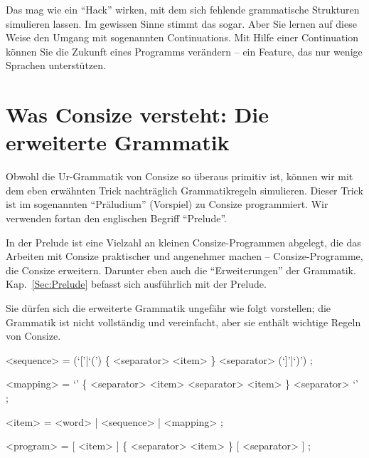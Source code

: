 

Das mag wie ein "`Hack"' wirken, mit dem sich fehlende grammatische Strukturen simulieren lassen. Im gewissen Sinne stimmt das sogar. Aber Sie lernen auf diese Weise den Umgang mit sogenannten Continuations. Mit Hilfe einer Continuation können Sie die Zukunft eines Programms verändern -- ein Feature, das nur wenige Sprachen unterstützen. 

\section{Was Consize versteht: Die erweiterte Grammatik}

Obwohl die Ur-Grammatik von Consize so überaus primitiv ist, können wir mit dem eben erwähnten Trick nachträglich Grammatikregeln simulieren. Dieser Trick ist im sogenannten "`Präludium"' (Vorspiel) zu Consize programmiert. Wir verwenden fortan den englischen Begriff "`Prelude"'.

In der Prelude ist eine Vielzahl an kleinen Consize-Programmen abgelegt, die das Arbeiten mit Consize praktischer und angenehmer machen -- Consize-Programme, die Consize erweitern. Darunter eben auch die "`Erweiterungen"' der Grammatik. Kap.~\ref{Sec:Prelude} befasst sich ausführlich mit der Prelude.

Sie dürfen sich die erweiterte Grammatik ungefähr wie folgt vorstellen; die Grammatik ist nicht vollständig und vereinfacht, aber sie enthält wichtige Regeln von Consize.

\begin{grammar}
<sequence> = (`['|`(') \{ <separator> <item> \} <separator> (`]'|`)') ;

<mapping> = `{' \{ <separator> <item> <separator> <item> \} <separator> `}' ;

<item> = <word> | <sequence> | <mapping> ;

<program> = [ <item> ] \{ <separator> <item> \} [ <separator> ] ;
\end{grammar}

